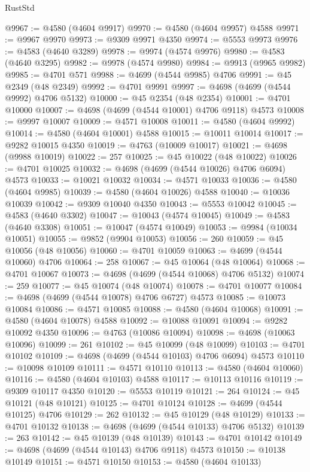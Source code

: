 \begin{lexlean}{RustStd}
\begin{coremodule}
@9967 := @4580 (@4604 @9917)
@9970 := @4580 (@4604 @9957) @4588
@9971 := @9967 @9970
@9973 := @9309 @9971 @4350
@9974 := @5553 @9973
@9976 := @4583 (@4640 @3289)
@9978 := @9974 (@4574 @9976)
@9980 := @4583 (@4640 @3295)
@9982 := @9978 (@4574 @9980)
@9984 := @9913 (@9965 @9982)
@9985 := @4701 @571
@9988 := @4699 (@4544 @9985) @4706
@9991 := @45 @2349 (@48 @2349)
@9992 := @4701 @9991
@9997 := @4698 (@4699 (@4544 @9992) @4706 @5132)
@10000 := @45 @2354 (@48 @2354)
@10001 := @4701 @10000
@10007 := @4698 (@4699 (@4544 @10001) @4706 @9118) @4573
@10008 := @9997 @10007
@10009 := @4571 @10008
@10011 := @4580 (@4604 @9992)
@10014 := @4580 (@4604 @10001) @4588
@10015 := @10011 @10014
@10017 := @9282 @10015 @4350
@10019 := @4763 (@10009 @10017)
@10021 := @4698 (@9988 @10019)
@10022 := 257
@10025 := @45 @10022 (@48 @10022)
@10026 := @4701 @10025
@10032 := @4698 (@4699 (@4544 @10026) @4706 @6094) @4573
@10033 := @10021 @10032
@10034 := @4571 @10033
@10036 := @4580 (@4604 @9985)
@10039 := @4580 (@4604 @10026) @4588
@10040 := @10036 @10039
@10042 := @9309 @10040 @4350
@10043 := @5553 @10042
@10045 := @4583 (@4640 @3302)
@10047 := @10043 (@4574 @10045)
@10049 := @4583 (@4640 @3308)
@10051 := @10047 (@4574 @10049)
@10053 := @9984 (@10034 @10051)
@10055 := @9852 (@9904 @10053)
@10056 := 260
@10059 := @45 @10056 (@48 @10056)
@10060 := @4701 @10059
@10063 := @4699 (@4544 @10060) @4706
@10064 := 258
@10067 := @45 @10064 (@48 @10064)
@10068 := @4701 @10067
@10073 := @4698 (@4699 (@4544 @10068) @4706 @5132)
@10074 := 259
@10077 := @45 @10074 (@48 @10074)
@10078 := @4701 @10077
@10084 := @4698 (@4699 (@4544 @10078) @4706 @6727) @4573
@10085 := @10073 @10084
@10086 := @4571 @10085
@10088 := @4580 (@4604 @10068)
@10091 := @4580 (@4604 @10078) @4588
@10092 := @10088 @10091
@10094 := @9282 @10092 @4350
@10096 := @4763 (@10086 @10094)
@10098 := @4698 (@10063 @10096)
@10099 := 261
@10102 := @45 @10099 (@48 @10099)
@10103 := @4701 @10102
@10109 := @4698 (@4699 (@4544 @10103) @4706 @6094) @4573
@10110 := @10098 @10109
@10111 := @4571 @10110
@10113 := @4580 (@4604 @10060)
@10116 := @4580 (@4604 @10103) @4588
@10117 := @10113 @10116
@10119 := @9309 @10117 @4350
@10120 := @5553 @10119
@10121 := 264
@10124 := @45 @10121 (@48 @10121)
@10125 := @4701 @10124
@10128 := @4699 (@4544 @10125) @4706
@10129 := 262
@10132 := @45 @10129 (@48 @10129)
@10133 := @4701 @10132
@10138 := @4698 (@4699 (@4544 @10133) @4706 @5132)
@10139 := 263
@10142 := @45 @10139 (@48 @10139)
@10143 := @4701 @10142
@10149 := @4698 (@4699 (@4544 @10143) @4706 @9118) @4573
@10150 := @10138 @10149
@10151 := @4571 @10150
@10153 := @4580 (@4604 @10133)

\end{coremodule}
\end{lexlean}
